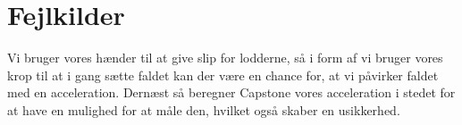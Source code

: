 \section{Fejlkilder}
Vi bruger vores hænder til at give slip for lodderne, så i form af vi bruger vores krop til at i gang sætte faldet kan der være en chance for, at vi påvirker faldet med en
acceleration. Dernæst så beregner Capstone vores acceleration i stedet for at have en mulighed for at måle den, hvilket også skaber en usikkerhed.

